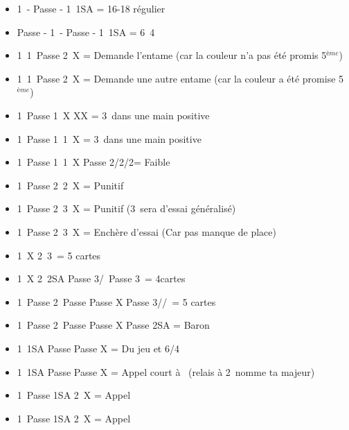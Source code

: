 \documentclass[a4paper, oneside, 11pt]{report}
\begin{document}
\newpage
	\begin{itemize}
	\item 1\trefle\ - Passe - 1\pique\ 1SA = 16-18 régulier
	\item Passe - 1\trefle\ - Passe - 1\pique\ 1SA = 6\carreau\ 4\coeur\\

	\item 1\trefle\ 1\pique\ Passe 2\trefle\ X = Demande l'entame (car la couleur n'a pas été promis 5$^{ème}$)
	\item 1\coeur\ 1\pique\ Passe 2\coeur\ X = Demande une autre entame (car la couleur a été promise 5$^{ème}$)\\

	\item 1\carreau\ Passe 1\coeur\ X XX = 3\coeur\ dans une main positive
	\item 1\carreau\ Passe 1\coeur\ 1\pique\ X = 3\coeur\ dans une main positive
	\item 1\carreau\ Passe 1\coeur\ 1\pique\ X Passe 2\trefle/2\carreau/2\coeur = Faible\\

	\item 1\coeur\ Passe 2\coeur\ 2\pique\ X = Punitif
	\item 1\coeur\ Passe 2\coeur\ 3\trefle\ X = Punitif (3\carreau\ sera d'essai généralisé)
	\item 1\coeur\ Passe 2\coeur\ 3\carreau\ X = Enchère d'essai (Car pas manque de place)\\

	\item 1\pique\ X 2\pique\ 3\coeur\ = 5 cartes
	\item 1\pique\ X 2\pique\ 2SA Passe 3\trefle/\carreau\ Passe 3\coeur\ = 4cartes
	\item 1\pique\ Passe 2\pique\ Passe Passe X Passe 3\trefle/\carreau/\coeur\ = 5 cartes
	\item 1\pique\ Passe 2\pique\ Passe Passe X Passe 2SA = Baron\\

	\item 1\coeur\ 1SA Passe Passe X = Du jeu et 6\coeur/4\pique
	\item 1\trefle\ 1SA Passe Passe X = Appel court à \carreau\ (relais à 2\carreau\ nomme ta majeur)\\

	\item 1\pique\ Passe 1SA 2\carreau\ X = Appel
	\item 1\carreau\ Passe 1SA 2\pique\ X = Appel\\


\end{itemize}
\end{document}
